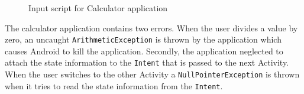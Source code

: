 \documentclass{acm_proc_article-sp}
\begin{document}
\begin{figure}
\vspace{-15pt}
\caption{Input script for Calculator application}
\label{fig:calc}
\vspace{-10pt}
\end{figure}


The calculator application contains two errors. When the user divides a value by zero, an uncaught
\texttt{ArithmeticException} is thrown by the application which causes Android to kill the application. Secondly, the application neglected
to attach the state information to the \texttt{Intent} that is passed to the next Activity. When the user switches to the other Activity a
\texttt{NullPointerException} is thrown when it tries to read the state information from the \texttt{Intent}. 
\end{document}

